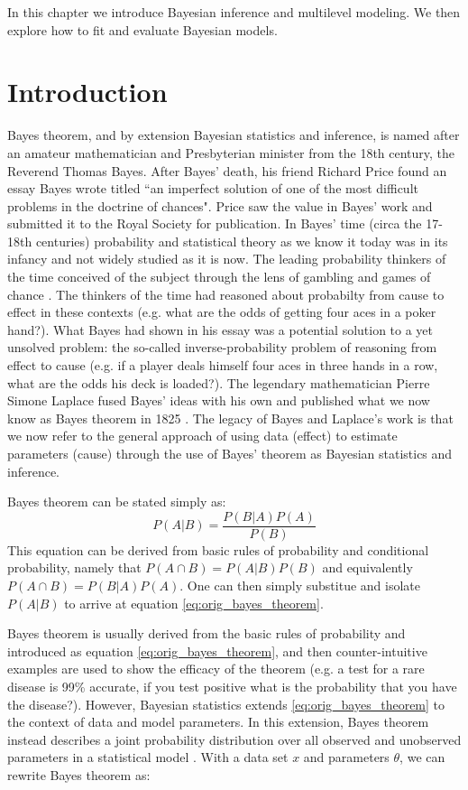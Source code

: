 In this chapter we introduce Bayesian inference and multilevel modeling. We then explore how to fit and evaluate Bayesian models.

\section{Introduction}

Bayes theorem, and by extension Bayesian statistics and inference, is named after an amateur mathematician and Presbyterian minister from the 18th century, the Reverend Thomas Bayes. After Bayes' death, his friend Richard Price found an essay Bayes wrote titled ``an imperfect solution of one of the most difficult problems in the doctrine of chances". Price saw the value in Bayes' work and submitted it to the Royal Society for publication. In Bayes' time (circa the 17-18th centuries) probability and statistical theory as we know it today was in its infancy and not widely studied as it is now. The leading probability thinkers of the time conceived of the subject through the lens of gambling and games of chance \cite{David1998} \cite{Moivre1718}. The thinkers of the time had reasoned about probabilty from cause to effect in these contexts (e.g. what are the odds of getting four aces in a poker hand?). What Bayes had shown in his essay was a potential solution to a yet unsolved problem: the so-called inverse-probability problem of reasoning from effect to cause (e.g. if a player deals himself four aces in three hands in a row, what are the odds his deck is loaded?). The legendary mathematician Pierre Simone Laplace fused Bayes' ideas with his own and published what we now know as Bayes theorem in 1825 \cite{Stigler1986}. The legacy of Bayes and Laplace's work is that we now refer to the general approach of using data (effect) to estimate parameters (cause) through the use of Bayes' theorem as Bayesian statistics and inference.

Bayes theorem can be stated simply as:
\begin{equation} \label{eq:orig_bayes_theorem}
P(A|B) = \frac{P(B|A)P(A)}{P(B)}
\end{equation}
This equation can be derived from basic rules of probability and conditional probability, namely that $P(A \cap B) = P(A|B)P(B)$ and equivalently $P(A \cap B) = P(B|A)P(A)$. One can then simply substitue and isolate $P(A|B)$ to arrive at equation \ref{eq:orig_bayes_theorem}.

Bayes theorem is usually derived from the basic rules of probability and introduced as equation \ref{eq:orig_bayes_theorem}, and then counter-intuitive examples are used to show the efficacy of the theorem (e.g. a test for a rare disease is 99\% accurate, if you test positive what is the probability that you have the disease?). However, Bayesian statistics extends \ref{eq:orig_bayes_theorem} to the context of data and model parameters. In this extension, Bayes theorem instead describes a joint probability distribution over all observed and unobserved parameters in a statistical model \cite{Schoot2021}. With a data set $x$ and parameters $\theta$, we can rewrite Bayes theorem as:


